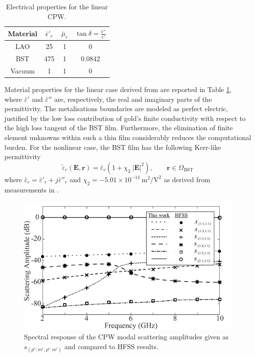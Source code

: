 \documentclass[journal,twoside,letterpaper]{IEEEtran}
\begin{document}
\begin{table}[t!]
\begin{center}
\begin{tabular}{|c||c|c|c|} \hline
Material & ${\bar{\epsilon}'}_r$ & $\bar{\mu}_r$ & $\tan \delta = \frac{\bar{\epsilon}''}{\bar{\epsilon}'}$ \\ \hline \hline
LAO & 25 & 1  & 0 \\ \hline
BST & 475 & 1 & 0.0842 \\ \hline
Vacuum & 1 & 1 & 0 \\ \hline
\end{tabular}
\end{center}
\caption{Electrical properties for the linear CPW.}
\label{tab:CPWmat}
\end{table}
%
Material properties for the linear case derived from \cite{mateu2006measurements} are reported in Table \ref{tab:CPWmat}, where $\bar{\varepsilon}'$ and $\bar{\varepsilon}''$ are, respectively, the real and imaginary parts of the permittivity. The metalisations boundaries are modeled as perfect electric, justified by the low loss contribution of gold's finite conductivity with respect to the high loss tangent of the BST film. Furthermore, the elimination of finite element unknowns within such a thin film considerably reduces the computational burden. For the nonlinear case, the BST film has the following Kerr-like permittivity
\begin{equation}
\label{eq:Kerr}
\tilde{{\varepsilon}}_r(\mathbf{E}, \mathbf{r}) = {\bar{\varepsilon}}_r \left( 1 + \chi_2 \ |\mathbf{E}|^2 \right), \qquad \mathbf{r} \in \Omega_\text{BST}
\end{equation}
%
\noindent where ${\bar{\varepsilon}}_r = {\bar{\varepsilon}'}_r  + j {\bar{\varepsilon}''}_r $ and $\chi_2 = -5.01 \times 10^{-14}~{\text{m}^2}/{\text{V}^2}$ as derived from measurements in \cite{mateu2006measurements}.
%
\begin{figure}[t!]
\centering
\includegraphics[width=\columnwidth]{spectrum}
\caption{Spectral response of the CPW modal scattering amplitudes given as $s_{(p^r:m^r,p^i:m^i)}$ and compared to HFSS results. }
\label{fig:Scattering}
\end{figure}
\end{document}
